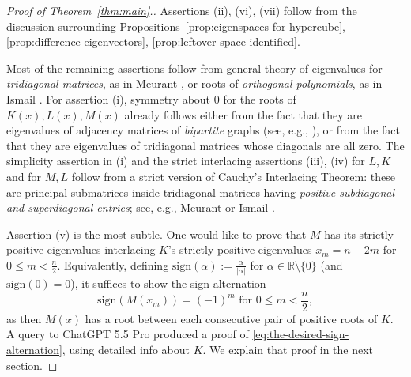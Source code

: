 \documentclass[10pt]{amsart}
\theoremstyle{plain}
\newcommand{\RR}{\mathbb{R}}
\newcommand{\sign}{\mathrm{sign}}
\begin{document}
\normalsize
\begin{proof}[Proof of Theorem~\ref{thm:main}.]
Assertions (ii), (vi), (vii) follow from the discussion surrounding
Propositions~\ref{prop:eigenspaces-for-hypercube},
\ref{prop:difference-eigenvectors}, \ref{prop:leftover-space-identified}.

Most of the remaining assertions
follow from general
theory of eigenvalues for
{\it tridiagonal matrices}, as in Meurant \cite{Meurant},
or roots of {\it orthogonal polynomials}, as in Ismail \cite{Ismail}.
For assertion (i), symmetry about $0$ for
the roots of $K(x), L(x),M(x)$ already follows either from
the fact that they are eigenvalues of adjacency matrices of {\it bipartite} graphs (see, e.g., \cite[Thm.~3.11]{CvetkovicDoobSachs}), or from the fact that they are eigenvalues
of tridiagonal matrices whose diagonals are all zero.  The
simplicity assertion in (i) and  the strict interlacing assertions (iii), (iv) for $L, K$ and for $M, L$ follow from a strict version of Cauchy's Interlacing Theorem: these are principal submatrices inside tridiagonal matrices having {\it positive subdiagonal and superdiagonal entries}; see, e.g.,  Meurant \cite[Prop.~2.21]{Meurant} or Ismail \cite[Thm.~2.2.3]{Ismail}. 

Assertion (v) is the most subtle.  One would like 
to prove that $M$ has its strictly positive eigenvalues interlacing
$K$'s strictly positive eigenvalues
$x_m=n-2m$ for $0 \leq m < \frac{n}{2}$.  Equivalently, defining
$\sign(\alpha):=\frac{\alpha}{|\alpha|}$
for $\alpha \in \RR \setminus \{0\}$ (and $\sign(0)=0$), it suffices to show the sign-alternation
\begin{equation}
\label{eq:the-desired-sign-alternation}
\sign(M(x_m))=(-1)^m \text{ for }0 \leq m < \frac{n}{2},
\end{equation}
as then $M(x)$ has a root between each consecutive pair of positive roots of \(K\).
A query to ChatGPT 5.5 Pro produced a proof of \eqref{eq:the-desired-sign-alternation}, using detailed info about $K$. We explain that proof in the next section.
\end{proof}

\end{document}
